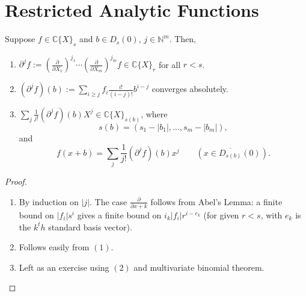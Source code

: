 \section{Restricted Analytic Functions}

\begin{lemma} Suppose $f\in \mathds{C}\{X\}_s$ and $b\in D_s(0)$, $j\in \mathds{N}^m$.  Then,
\begin{enumerate}[(1)]
\item $\partial^j f :=\left (\frac{\partial}{\partial X_1} \right )^{j_1} \cdots \left (\frac{\partial}{\partial X_m} \right )^{j_m}f\in \mathds{C}\{X\}_r$ for all $r<s$.
\item $(\partial^jf)(b):= \sum_{i\geq j} f_i \frac{i!}{(i-j)!}b^{i-j}$ converges absolutely.  
\item $\sum_j \frac{1}{j!} (\partial^jf)(b)X^j\in \mathds{C}\{X\}_{s(b)}$, where
$$s(b)=(s_1-|b_1|, \dots, s_m-|b_m|),$$
and
$$f(x+b) = \sum_j\frac{1}{j!}(\partial^jf)(b)x^j \qquad (x\in \overline{D_{s(b)}}(0)).$$
\end{enumerate}
\end{lemma}

\begin{proof} \begin{enumerate}[(1)]
\item By induction on $|j|$.  The case $\frac{\partial}{\partial x+k}$ follows from Abel's Lemma: a finite bound on $|f_i|s^i$ gives a finite bound on $i_k|f_i|r^{i-e_k}$ (for given $r<s$, with $e_k$ is the $k^th$ standard basis vector).  
\item Follows easily from $(1)$.
\item Left as an exercise using $(2)$ and multivariate binomial theorem. 
\end{enumerate}\end{proof}

